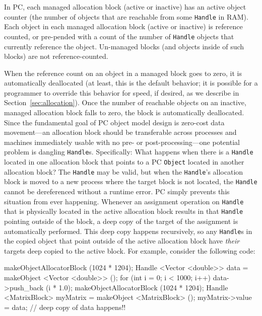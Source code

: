\vspace{5pt}

In PC, each managed allocation block (active or inactive) has an active object counter (the number of objects that are reachable
from some \texttt{Handle} in RAM).  Each object in each managed allocation block (active or inactive) is reference counted, or pre-pended with a count of
the number of \texttt{Handle} objects that currently reference the object.  
Un-managed blocks (and objects inside of such blocks) are not reference-counted.

When the reference count on an object in a managed block goes to zero, it is automatically
deallocated (at least, this is the default behavior; it is possible
for a programmer to override this behavior for speed, if desired, as
we describe in Section~\ref{sec:allocation}).  
Once the number of reachable objects on an inactive, managed allocation block falls to zero, the block is automatically deallocated.  
Since the fundamental goal of PC object model design is 
zero-cost data movement---an allocation block should be
transferable across processes and machines immediately usable with no pre- or post-processing---one
potential problem is dangling \texttt{Handle}s.  Specifically: What happens when there is a \texttt{Handle} located in one allocation block that points to a PC
\texttt{Object} located in another allocation block?  The \texttt{Handle} may be valid, but when the \texttt{Handle}'s allocation block is moved to a new process where
the target block is not located, the \texttt{Handle} cannot be dereferenced without a runtime error. 
PC simply prevents this situation from ever happening. Whenever an assignment operation on \texttt{Handle} that is physically located
in the active allocation block results in that
\texttt{Handle} pointing outside of the block, a deep copy of the target of the assignment
is automatically performed.  This deep copy happens recursively, so any \texttt{Handle}s in the copied object that point outside of the active allocation block
have \emph{their} targets deep copied to the active block.  For example, consider the following code:

\begin{codesmall}
makeObjectAllocatorBlock (1024 * 1204);
Handle <Vector <double>> data = 
     makeObject <Vector <double>> ();
for (int i = 0; i < 1000; i++)
     data->push_back (i * 1.0);
makeObjectAllocatorBlock (1024 * 1204); 
Handle <MatrixBlock> myMatrix = 
     makeObject <MatrixBlock> ();
myMatrix->value = data; // deep copy of data happens!!
\end{codesmall}

